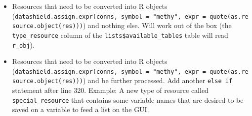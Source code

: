 \documentclass[
]{book}
\newenvironment{Shaded}{\begin{snugshade}}{\end{snugshade}}
\newcommand{\AttributeTok}[1]{\textcolor[rgb]{0.77,0.63,0.00}{#1}}
\newcommand{\CommentTok}[1]{\textcolor[rgb]{0.56,0.35,0.01}{\textit{#1}}}
\newcommand{\ControlFlowTok}[1]{\textcolor[rgb]{0.13,0.29,0.53}{\textbf{#1}}}
\newcommand{\FunctionTok}[1]{\textcolor[rgb]{0.00,0.00,0.00}{#1}}
\newcommand{\NormalTok}[1]{#1}
\newcommand{\OtherTok}[1]{\textcolor[rgb]{0.56,0.35,0.01}{#1}}
\newcommand{\SpecialCharTok}[1]{\textcolor[rgb]{0.00,0.00,0.00}{#1}}
\newcommand{\StringTok}[1]{\textcolor[rgb]{0.31,0.60,0.02}{#1}}
\providecommand{\tightlist}{%
  \setlength{\itemsep}{0pt}\setlength{\parskip}{0pt}}
\begin{document}
\begin{Shaded}
\end{Shaded}

\begin{itemize}
\tightlist
\item
  Resources that need to be converted into R objects (\texttt{datashield.assign.expr(conns,\ symbol\ =\ "methy",\ expr\ =\ quote(as.resource.object(res)))}) and nothing else. Will work out of the box (the \texttt{type\_resource} column of the \texttt{lists\$available\_tables} table will read \texttt{r\_obj}).
\item
  Resources that need to be converted into R objects (\texttt{datashield.assign.expr(conns,\ symbol\ =\ "methy",\ expr\ =\ quote(as.resource.object(res)))}) and be further processed. Add another \texttt{else\ if} statement after line 320. Example: A new type of resource called \texttt{special\_resource} that contains some variable names that are desired to be saved on a variable to feed a list on the GUI.
\end{itemize}

\begin{Shaded}
\end{Shaded}
\end{document}
